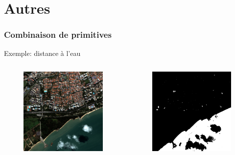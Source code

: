 \documentclass[compress]{beamer}
\begin{document}
\section{Autres}


\begin{frame}
\frametitle{Combinaison de primitives}
Exemple: distance à l'eau
\begin{columns}
\begin{column}{0.32\textwidth}
\begin{figure}[]
  \includegraphics[width=1.0\textwidth]{radio2-extract-3b.jpg}
\end{figure}
\end{column}
\begin{column}{0.32\textwidth}
\begin{figure}[]
  \includegraphics[width=1.0\textwidth]{MNDWI2-threshold.jpg}

\end{figure}
\end{column}
\end{columns}
\end{frame}
\end{document}

